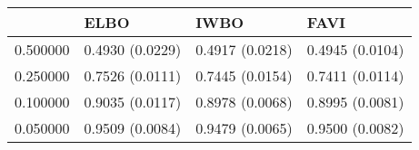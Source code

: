 \begin{tabular}{llll}
\toprule
 & ELBO & IWBO & FAVI \\
\midrule
0.500000 & 0.4930 (0.0229) & 0.4917 (0.0218) & 0.4945 (0.0104) \\
0.250000 & 0.7526 (0.0111) & 0.7445 (0.0154) & 0.7411 (0.0114) \\
0.100000 & 0.9035 (0.0117) & 0.8978 (0.0068) & 0.8995 (0.0081) \\
0.050000 & 0.9509 (0.0084) & 0.9479 (0.0065) & 0.9500 (0.0082) \\
\bottomrule
\end{tabular}
